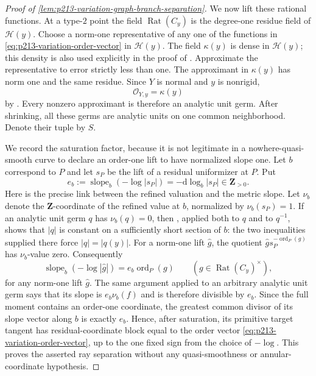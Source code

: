 \begin{proof}[Proof of
\cref{lem:p213-variation-graph-branch-separation}]
We now lift these rational functions.  At a type-$2$ point the field
$\operatorname{Rat}(C_y)$ is the degree-one residue field of
$\mathcal H(y)$.  Choose a norm-one representative of any one of the
functions in \eqref{eq:p213-variation-order-vector} in $\mathcal H(y)$.
The field $\kappa(y)$ is dense in $\mathcal H(y)$; this density is also
used explicitly in the proof of \cite[Lemma~12.2.3]{CLD25}.  Approximate
the representative to error strictly less than one.  The approximant in
$\kappa(y)$ has norm one and the same residue.  Since $Y$ is normal and
$y$ is nonrigid,
\begin{equation}
                         \mathcal O_{Y,y}=\kappa(y)
 \label{eq:p213-variation-normal-local-field}
\end{equation}
by \cite[§4.2.18]{Ducros24CurveStructure}.  Every nonzero approximant
is therefore an analytic unit germ.  After shrinking, all these germs are
analytic units on one common neighborhood.  Denote their tuple by $S$.

We record the saturation factor, because it is not legitimate in a
nowhere-quasi-smooth curve to declare an order-one lift to have normalized
slope one.  Let $b$ correspond to $P$ and let $s_P$ be the lift of a
residual uniformizer at $P$.  Put
\begin{equation}
             e_b:=\operatorname{slope}_b(-\log|s_P|)
                 =-\mathrm d\log_b|s_P|\in\mathbf Z_{>0}.
 \label{eq:p213-variation-branch-index}
\end{equation}
Here is the precise link between the refined valuation and the metric
slope.  Let $\nu_b$ denote the $\mathbf Z$-coordinate of the refined value
at $b$, normalized by $\nu_b(s_P)=1$.  If an analytic unit germ $q$ has
$\nu_b(q)=0$, then \cite[§4.2.6]{Ducros24CurveStructure}, applied both to
$q$ and to $q^{-1}$, shows that $|q|$ is constant on a sufficiently short
section of $b$: the two inequalities supplied there force
$|q|=|q(y)|$.  For a norm-one lift $\widehat g$, the quotient
$\widehat g s_P^{-\operatorname{ord}_P(g)}$ has $\nu_b$-value zero.
Consequently
\begin{equation}
 \operatorname{slope}_b(-\log|\widehat g|)
       =e_b\operatorname{ord}_{P}(g)
       \qquad(g\in\operatorname{Rat}(C_y)^\times),
 \label{eq:p213-variation-residual-slope}
\end{equation}
for any norm-one lift $\widehat g$.  The same argument applied to an
arbitrary analytic unit germ says that its slope is $e_b\nu_b(f)$ and is
therefore divisible by $e_b$.
Since the full moment contains an order-one coordinate, the greatest
common divisor of its slope vector along $b$ is exactly $e_b$.  Hence,
after saturation, its primitive target tangent has residual-coordinate
block equal to the order vector
\eqref{eq:p213-variation-order-vector}, up to the one fixed sign from the
choice of $-\log$.  This proves the asserted ray separation without any
quasi-smoothness or annular-coordinate hypothesis.


\end{proof}
